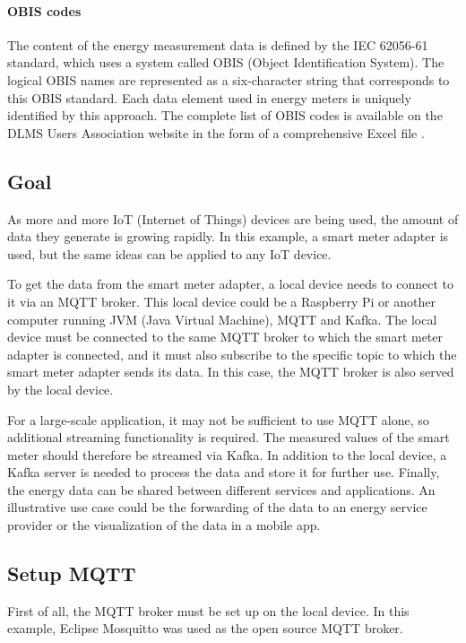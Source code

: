 \paragraph{OBIS codes}
The content of the energy measurement data is defined by the IEC 62056-61 standard, which uses a system called OBIS (Object Identification System). The logical OBIS names are represented as a six-character string that corresponds to this OBIS standard. Each data element used in energy meters is uniquely identified by this approach. The complete list of OBIS codes is available on the DLMS Users Association website in the form of a comprehensive Excel file \cite{amaro2011implementing}.

\subsection{Goal}

As more and more IoT (Internet of Things) devices are being used, the amount of data they generate is growing rapidly. In this example, a smart meter adapter is used, but the same ideas can be applied to any IoT device.

To get the data from the smart meter adapter, a local device needs to connect to it via an MQTT broker. This local device could be a Raspberry Pi or another computer running JVM (Java Virtual Machine), MQTT and Kafka. The local device must be connected to the same MQTT broker to which the smart meter adapter is connected, and it must also subscribe to the specific topic to which the smart meter adapter sends its data. In this case, the MQTT broker is also served by the local device.

For a large-scale application, it may not be sufficient to use MQTT alone, so additional streaming functionality is required. The measured values of the smart meter should therefore be streamed via Kafka. In addition to the local device, a Kafka server is needed to process the data and store it for further use. Finally, the energy data can be shared between different services and applications. An illustrative use case could be the forwarding of the data to an energy service provider or the visualization of the data in a mobile app. 

\subsection{Setup MQTT}

First of all, the MQTT broker must be set up on the local device. In this example, Eclipse Mosquitto \cite{mosquitto} was used as the open source MQTT broker.

